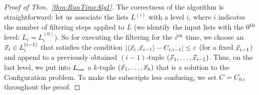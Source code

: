 \begin{proof}[Proof of Thm.~\ref{thm:RunTimeAlg1}]
	The correctness of the algorithm is straightforward: let us associate the lists $L^{(i)}$ with a level $i$, where $i$ indicates the number of filtering steps applied to $L$ (we identify the input lists with the $0^{\mathrm{th}}$ level: $L_i=L^{(0)}_i$). So for executing the filtering for the $i^{\mathrm{th}}$ time, we choose an $\vec x_{i} \in L_{i}^{(i-1)}$ that satisfies the condition $\left|\langle\vec x_i\!\mathbin{,}\!\vec x_{i-1}\rangle - C_{i,i-1}\right| \leq \varepsilon$ (for a fixed $\vec x_{i-1}$) and append to a previously obtained $(i-1)$-tuple $(\vec x_1, \ldots, \vec x_{i-1})$. Thus, on the last level, we put into $\Lout$ a $k$-tuple $(\vec x_1, \ldots, \vec x_{k})$ that is a solution to the Configuration problem. To make the subscripts less confusing, we set $C = \Cbalt$ throughout the proof. 
	

\end{proof}
